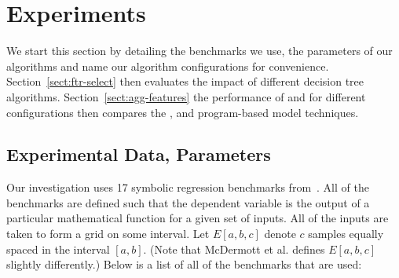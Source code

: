 
\section{Experiments}\label{sect:experiments}

We start this section by detailing the benchmarks we use, the parameters of our algorithms and name our algorithm configurations for convenience. Section~\ref{sect:ftr-select} then evaluates the impact of different decision tree algorithms. Section~\ref{sect:agg-features} the performance of \FULL and \DRAW for different configurations then compares the \FULL, \DRAW and program-based model techniques.
 
\subsection{Experimental Data, Parameters}\label{sect:data_sets}

Our investigation uses 17 symbolic regression benchmarks from~\cite{benchmarks}. All of the benchmarks are defined such that the dependent variable is the output of a particular mathematical function for a given set of inputs.  All of the inputs are taken to form a grid on some interval.  Let $E[a, b, c]$ denote $c$ samples equally spaced in the interval $[a,b]$. (Note that McDermott et al. defines $E[a, b, c]$ slightly differently.)  Below is a list of all of the benchmarks that are used:


